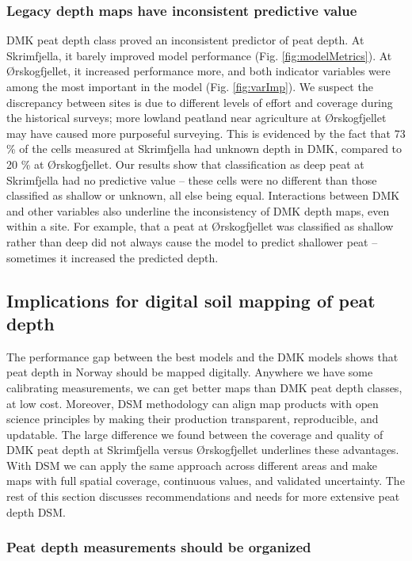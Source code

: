 \documentclass[soil, manuscript]{copernicus}
\begin{document}
\subsubsection{Legacy depth maps have inconsistent predictive value}

DMK peat depth class proved an inconsistent predictor of peat depth.
At Skrimfjella, it barely improved model performance (Fig. \ref{fig:modelMetrics}).
At Ørskogfjellet, it increased performance more, and both indicator variables were among the most important in the model (Fig. \ref{fig:varImp}).
We suspect the discrepancy between sites is due to different levels of effort and coverage during the historical surveys; more lowland peatland near agriculture at Ørskogfjellet may have caused more purposeful surveying.
This is evidenced by the fact that 73 \% of the cells measured at Skrimfjella had unknown depth in DMK, compared to 20 \% at Ørskogfjellet.
Our results show that classification as deep peat at Skrimfjella had no predictive value -- these cells were no different than those classified as shallow or unknown, all else being equal.
Interactions between DMK and other variables also underline the inconsistency of DMK depth maps, even within a site.
For example, that a peat at Ørskogfjellet was classified as shallow rather than deep did not always cause the model to predict shallower peat -- sometimes it increased the predicted depth.

\subsection{Implications for digital soil mapping of peat depth}

The performance gap between the best models and the DMK models shows that peat depth in Norway should be mapped digitally.
Anywhere we have some calibrating measurements, we can get better maps than DMK peat depth classes, at low cost.
Moreover, DSM methodology can align map products with open science principles by making their production transparent, reproducible, and updatable.
The large difference we found between the coverage and quality of DMK peat depth at Skrimfjella versus Ørskogfjellet underlines these advantages.
With DSM we can apply the same approach across different areas and make maps with full spatial coverage, continuous values, and validated uncertainty.
The rest of this section discusses recommendations and needs for more extensive peat depth DSM.

\subsubsection{Peat depth measurements should be organized}
\end{document}
